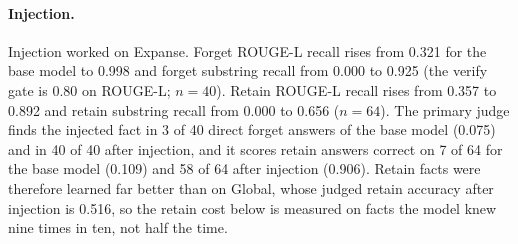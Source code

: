 \documentclass[10pt,twocolumn]{article}
\begin{document}
\paragraph{Injection.} Injection worked on Expanse. Forget ROUGE-L recall rises from 0.321 for the base model to 0.998 and forget substring recall from 0.000 to 0.925 (the verify gate is 0.80 on ROUGE-L; $n=40$). Retain ROUGE-L recall rises from 0.357 to 0.892 and retain substring recall from 0.000 to 0.656 ($n=64$). The primary judge finds the injected fact in 3 of 40 direct forget answers of the base model (0.075) and in 40 of 40 after injection, and it scores retain answers correct on 7 of 64 for the base model (0.109) and 58 of 64 after injection (0.906). Retain facts were therefore learned far better than on Global, whose judged retain accuracy after injection is 0.516, so the retain cost below is measured on facts the model knew nine times in ten, not half the time.
\end{document}
